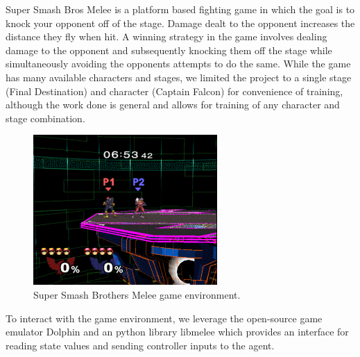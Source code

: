 Super Smash Bros Melee is a platform based fighting game in which the goal is to knock your opponent off of the stage. Damage dealt to the opponent increases the distance they fly when hit. A winning strategy in the game involves dealing damage to the opponent and subsequently knocking them off the stage while simultaneously avoiding the opponents attempts to do the same. While the game has many available characters and stages, we limited the project to a single stage (Final Destination) and character (Captain Falcon) for convenience of training, although the work done is general and allows for training of any character and stage combination.

\begin{figure}[!htb]
\centering
	\includegraphics[width=70mm]{stage.png}
	\caption{Super Smash Brothers Melee game environment. \label{melee}}
\end{figure}

To interact with the game environment, we leverage the open-source game emulator Dolphin and an python library libmelee which provides an interface for reading state values and sending controller inputs to the agent. 







